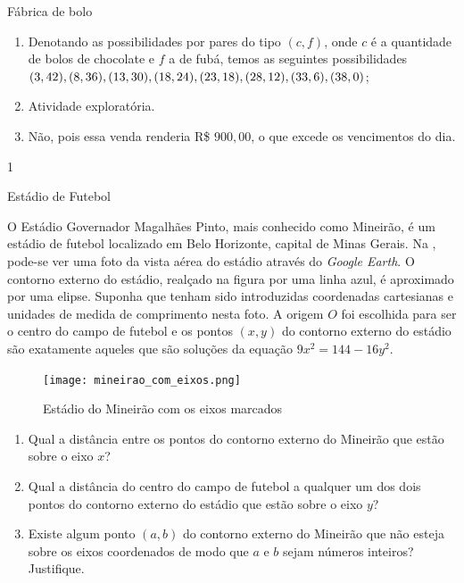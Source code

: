 \begin{answer}{Fábrica de bolo}
{
\begin{enumerate}
\item Denotando as possibilidades por pares do tipo $(c,f)$, onde $c$ é a quantidade de bolos de chocolate e $f$ a de fubá, temos as seguintes possibilidades $(3,42), (8,36), (13,30), \newline (18,24), (23,18), (28,12), \newline(33,6),(38,0)$;
\item Atividade exploratória.
\item Não, pois essa venda renderia R\$ $900{,}00$, o que excede os vencimentos do dia.
\end{enumerate}
}{1}
\end{answer}

\label{\detokenize{AF107-1:praticando-taxa-de-variacao-media}}\label{\detokenize{AF107-1::doc}}

\begin{task}{Estádio de Futebol}
\label{estadio}

O Estádio Governador Magalhães Pinto, mais conhecido como Mineirão, é um estádio de futebol localizado em Belo Horizonte, capital de Minas Gerais. Na , pode-se ver uma foto da vista aérea do estádio através do \emph{Google Earth}. O contorno externo do estádio, realçado na figura por uma linha azul, é aproximado por uma elipse. Suponha que tenham sido introduzidas coordenadas cartesianas e unidades de medida de comprimento nesta foto. A origem $O$ foi escolhida para ser o centro do campo de futebol e os pontos $(x, y)$ do contorno externo do estádio são exatamente aqueles que são soluções da equação $9x^2 = 144 - 16y^2$.



\begin{figure}[H]
\centering

\noindent\texttt{[image: mineirao\_com\_eixos.png]}
\caption{Estádio do Mineirão com os eixos marcados}
\label{mineirao}
\end{figure}

\begin{enumerate}

\item{} 
Qual a distância entre os pontos do contorno externo do Mineirão que estão sobre o eixo $x$?

\item{}
Qual a distância do centro do campo de futebol a qualquer um dos dois pontos do contorno externo do estádio que estão sobre o eixo $y$?

\item{}
Existe algum ponto $(a,b)$ do contorno externo do Mineirão que não esteja sobre os eixos coordenados de modo que $a$ e $b$ sejam números inteiros? Justifique.


\end{enumerate}

\end{task}

